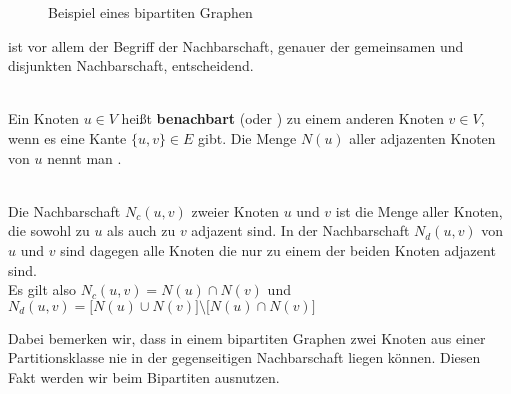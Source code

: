 \begin{figure}
\centering
{}
\caption{Beispiel eines bipartiten Graphen}
\label{fig:beispiel_bipartit}
\end{figure}
 ist vor allem der Begriff der Nachbarschaft, genauer der gemeinsamen und disjunkten 
Nachbarschaft, entscheidend.
\begin{definition}[Nachbarschaft]~\\
Ein Knoten $u \in V$ heißt \textbf{benachbart} (oder ) zu einem 
anderen Knoten $v \in V$, wenn es eine Kante $\{u,v\} \in E $ gibt. Die Menge $N(u)$ aller adjazenten Knoten
von $u$ nennt man .
\end{definition}
\begin{definition}~\\
	Die  Nachbarschaft $N_{c}(u,v)$ zweier Knoten $u$ und $v$ ist die Menge aller Knoten, die sowohl
	zu $u$ als auch zu $v$ adjazent sind. In der  Nachbarschaft $N_{d}(u,v)$ von $u$ und $v$ sind dagegen 
	alle Knoten die nur zu einem der beiden Knoten adjazent sind. \\
	Es gilt also $N_{c}(u,v) = N(u) \cap N(v)$ und $N_{d}(u,v) = \big[N(u) \cup N(v)\big]\setminus \big[N(u) \cap N(v) \big]$
\end{definition}
\noindent
Dabei bemerken wir, dass in einem bipartiten Graphen zwei Knoten aus einer Partitionsklasse nie
in der gegenseitigen Nachbarschaft liegen können. Diesen Fakt werden wir beim Bipartiten \gc ausnutzen.


